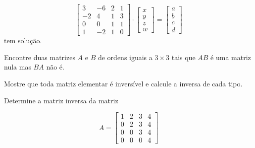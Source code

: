 \begin{questions}
  \[
    \begin{bmatrix}
      3  & -6 & 2 & 1 \\
      -2 & 4  & 1 & 3 \\
      0  & 0  & 1 & 1 \\
      1  & -2 & 1 & 0
    \end{bmatrix}
    \cdot
    \begin{bmatrix}
      x \\
      y \\
      z \\
      w
    \end{bmatrix}=
    \begin{bmatrix}
      a \\
      b \\
      c \\
      d
    \end{bmatrix}
  \]
  tem solução.

  \begin{solutionordottedlines}
  \end{solutionordottedlines}

  \question\label{exercício:8}

  Encontre duas matrizes $A$ e $B$ de ordens iguais a $3\times3$ tais
  que $AB$ é uma matriz nula mas $BA$ não é.

  \begin{solutionordottedlines}
  \end{solutionordottedlines}

  \question\label{exercício:9}

  Mostre que toda matriz elementar é inversível e calcule a inversa de
  cada tipo.

  \begin{solutionordottedlines}
  \end{solutionordottedlines}

  \question\label{exercício:10}

  Determine a matriz inversa da matriz

  \[
    A=
    \begin{bmatrix}
      1 & 2 & 3 & 4 \\
      0 & 2 & 3 & 4 \\
      0 & 0 & 3 & 4 \\
      0 & 0 & 0 & 4
    \end{bmatrix}
  \]

  \begin{solutionordottedlines}
  \end{solutionordottedlines}



\end{questions}
